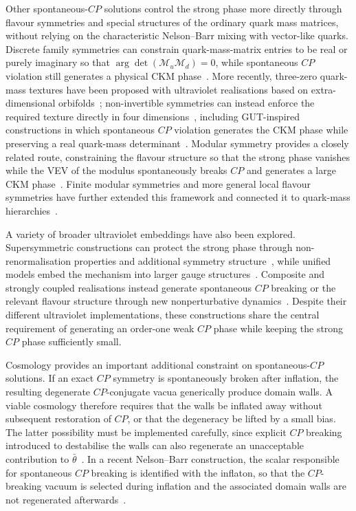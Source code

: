 \documentclass[review]{elsarticle}
\numberwithin{equation}{section}
\numberwithin{table}{section}
\numberwithin{figure}{section}
\def\M{\mathcal{M}}
\begin{document}
Other spontaneous-$CP$ solutions control the strong phase more directly through flavour symmetries and special structures of the ordinary quark mass matrices, without relying on the characteristic Nelson--Barr mixing with vector-like quarks. Discrete family symmetries can constrain quark-mass-matrix entries to be real or purely imaginary so that $\arg\det(\M_u\M_d)=0$, while spontaneous $CP$ violation still generates a physical CKM phase~\cite{Antusch:2013rla}. More recently, three-zero quark-mass textures have been proposed with ultraviolet realisations based on extra-dimensional orbifolds~\cite{Liang:2024wbb}; non-invertible symmetries can instead enforce the required texture directly in four dimensions~\cite{Liang:2025dkm}, including GUT-inspired constructions in which spontaneous $CP$ violation generates the CKM phase while preserving a real quark-mass determinant~\cite{Kobayashi:2025thd}. Modular symmetry provides a closely related route, constraining the flavour structure so that the strong phase vanishes while the VEV of the modulus spontaneously breaks $CP$ and generates a large CKM phase~\cite{Feruglio:2023uof,Petcov:2024vph,Penedo:2024gtb,Feruglio:2025ajb}. Finite modular symmetries and more general local flavour symmetries have further extended this framework and connected it to quark-mass hierarchies~\cite{Feruglio:2024ytl,Liu:2026ati}.

A variety of broader ultraviolet embeddings have also been explored. Supersymmetric constructions can protect the strong phase through non-renormalisation properties and additional symmetry structure~\cite{Evans:2020vil,Liu:2025ycm}, while unified models embed the mechanism into larger gauge structures~\cite{Schwichtenberg:2018aqc,Murgui:2026wim}. Composite and strongly coupled realisations instead generate spontaneous $CP$ breaking or the relevant flavour structure through new nonperturbative dynamics~\cite{Perez:2020dbw,Girmohanta:2022giy,Nakagawa:2024ddd,Csaki:2025ikr}. Despite their different ultraviolet implementations, these constructions share the central requirement of generating an order-one weak $CP$ phase while keeping the strong $CP$ phase sufficiently small.

Cosmology provides an important additional constraint on spontaneous-$CP$ solutions. If an exact $CP$ symmetry is spontaneously broken after inflation, the resulting degenerate $CP$-conjugate vacua generically produce domain walls. A viable cosmology therefore requires that the walls be inflated away without subsequent restoration of $CP$, or that the degeneracy be lifted by a small bias. The latter possibility must be implemented carefully, since explicit $CP$ breaking introduced to destabilise the walls can also regenerate an unacceptable contribution to $\bar\theta$~\cite{Asadi:2022vys,Murai:2024alz}. In a recent Nelson--Barr construction, the scalar responsible for spontaneous $CP$ breaking is identified with the inflaton, so that the $CP$-breaking vacuum is selected during inflation and the associated domain walls are not regenerated afterwards~\cite{Takahashi:2026pmf}.
\end{document}
